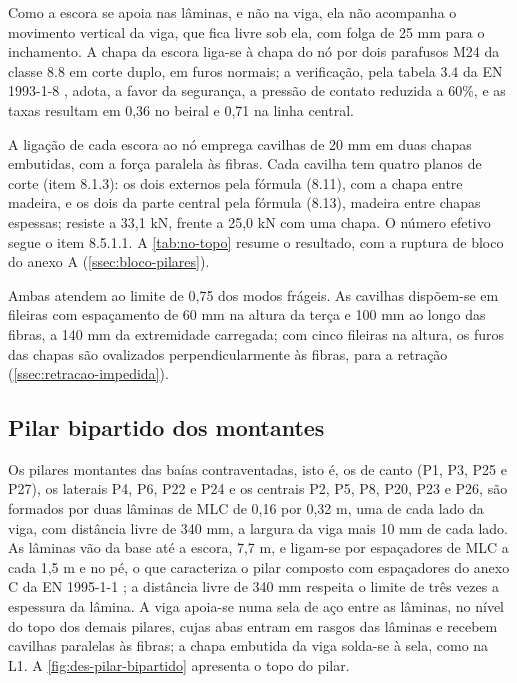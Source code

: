 Como a escora se apoia nas lâminas, e não na viga, ela não acompanha o
movimento vertical da viga, que fica livre sob ela, com folga de 25 mm para o
inchamento. A chapa da escora liga-se à chapa do nó por dois parafusos M24 da
classe 8.8 em corte duplo, em furos normais; a verificação, pela tabela 3.4 da
EN 1993-1-8 \cite{EN1993-1-8:2005}, adota, a favor da segurança, a pressão de
contato reduzida a 60\%, e as taxas resultam em 0,36 no beiral e 0,71 na linha
central.

A ligação de cada escora ao nó emprega cavilhas de 20 mm em duas chapas
embutidas, com a força paralela às fibras. Cada cavilha tem quatro planos de
corte (item 8.1.3): os dois externos pela fórmula (8.11), com a chapa entre
madeira, e os dois da parte central pela fórmula (8.13), madeira entre chapas
espessas; resiste a 33,1 kN, frente a 25,0 kN com uma chapa. O número efetivo segue
o item 8.5.1.1. A \autoref{tab:no-topo} resume o
resultado, com a ruptura de bloco do anexo A (\autoref{ssec:bloco-pilares}).


Ambas atendem ao limite de 0,75 dos modos frágeis. As cavilhas dispõem-se em
fileiras com espaçamento de 60 mm na altura da terça e 100 mm ao longo das
fibras, a 140 mm da extremidade carregada; com cinco fileiras na altura, os furos
das chapas são ovalizados perpendicularmente às fibras, para a retração
(\autoref{ssec:retracao-impedida}).

\subsection{Pilar bipartido dos montantes}\label{ssec:pilar-bipartido}

Os pilares montantes das baías contraventadas, isto é, os de canto (P1, P3, P25
e P27), os laterais P4, P6, P22 e P24 e os centrais P2, P5, P8, P20, P23 e P26,
são formados por duas lâminas de MLC de 0,16 por 0,32 m, uma de cada lado da
viga, com distância livre de 340 mm, a largura da viga mais 10 mm de cada lado. As
lâminas vão da base até a escora, 7,7 m, e ligam-se por espaçadores de MLC a
cada 1,5 m e no pé, o que caracteriza o pilar composto com espaçadores do
anexo C da EN 1995-1-1 \cite{EN1995-1-1:2004}; a distância livre de 340 mm
respeita o limite de três vezes a espessura da lâmina. A viga apoia-se numa sela
de aço entre as lâminas, no nível do topo dos demais pilares, cujas abas entram
em rasgos das lâminas e recebem cavilhas paralelas às fibras; a chapa embutida da
viga solda-se à sela, como na L1. A \autoref{fig:des-pilar-bipartido} apresenta o
topo do pilar.

